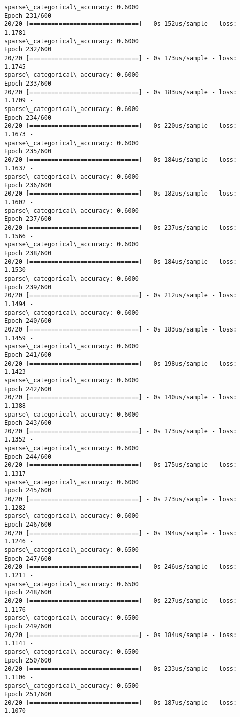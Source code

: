 \documentclass[11pt]{article}
\begin{document}
\begin{Verbatim}[commandchars=\\\{\}]
sparse\_categorical\_accuracy: 0.6000
Epoch 231/600
20/20 [==============================] - 0s 152us/sample - loss: 1.1781 -
sparse\_categorical\_accuracy: 0.6000
Epoch 232/600
20/20 [==============================] - 0s 173us/sample - loss: 1.1745 -
sparse\_categorical\_accuracy: 0.6000
Epoch 233/600
20/20 [==============================] - 0s 183us/sample - loss: 1.1709 -
sparse\_categorical\_accuracy: 0.6000
Epoch 234/600
20/20 [==============================] - 0s 220us/sample - loss: 1.1673 -
sparse\_categorical\_accuracy: 0.6000
Epoch 235/600
20/20 [==============================] - 0s 184us/sample - loss: 1.1637 -
sparse\_categorical\_accuracy: 0.6000
Epoch 236/600
20/20 [==============================] - 0s 182us/sample - loss: 1.1602 -
sparse\_categorical\_accuracy: 0.6000
Epoch 237/600
20/20 [==============================] - 0s 237us/sample - loss: 1.1566 -
sparse\_categorical\_accuracy: 0.6000
Epoch 238/600
20/20 [==============================] - 0s 184us/sample - loss: 1.1530 -
sparse\_categorical\_accuracy: 0.6000
Epoch 239/600
20/20 [==============================] - 0s 212us/sample - loss: 1.1494 -
sparse\_categorical\_accuracy: 0.6000
Epoch 240/600
20/20 [==============================] - 0s 183us/sample - loss: 1.1459 -
sparse\_categorical\_accuracy: 0.6000
Epoch 241/600
20/20 [==============================] - 0s 198us/sample - loss: 1.1423 -
sparse\_categorical\_accuracy: 0.6000
Epoch 242/600
20/20 [==============================] - 0s 140us/sample - loss: 1.1388 -
sparse\_categorical\_accuracy: 0.6000
Epoch 243/600
20/20 [==============================] - 0s 173us/sample - loss: 1.1352 -
sparse\_categorical\_accuracy: 0.6000
Epoch 244/600
20/20 [==============================] - 0s 175us/sample - loss: 1.1317 -
sparse\_categorical\_accuracy: 0.6000
Epoch 245/600
20/20 [==============================] - 0s 273us/sample - loss: 1.1282 -
sparse\_categorical\_accuracy: 0.6000
Epoch 246/600
20/20 [==============================] - 0s 194us/sample - loss: 1.1246 -
sparse\_categorical\_accuracy: 0.6500
Epoch 247/600
20/20 [==============================] - 0s 246us/sample - loss: 1.1211 -
sparse\_categorical\_accuracy: 0.6500
Epoch 248/600
20/20 [==============================] - 0s 227us/sample - loss: 1.1176 -
sparse\_categorical\_accuracy: 0.6500
Epoch 249/600
20/20 [==============================] - 0s 184us/sample - loss: 1.1141 -
sparse\_categorical\_accuracy: 0.6500
Epoch 250/600
20/20 [==============================] - 0s 233us/sample - loss: 1.1106 -
sparse\_categorical\_accuracy: 0.6500
Epoch 251/600
20/20 [==============================] - 0s 187us/sample - loss: 1.1070 -

\end{Verbatim}
\end{document}
